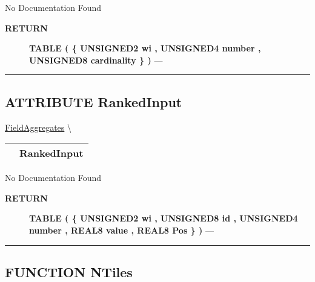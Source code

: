 \par





No Documentation Found








\par
\begin{description}
\item [\colorbox{tagtype}{\color{white} \textbf{\textsf{RETURN}}}] \textbf{TABLE ( \{ UNSIGNED2 wi , UNSIGNED4 number , UNSIGNED8 cardinality \} )} --- 
\end{description}




\rule{\linewidth}{0.5pt}
\subsection*{\textsf{\colorbox{headtoc}{\color{white} ATTRIBUTE}
RankedInput}}

\hypertarget{ecldoc:ml_core.fieldaggregates.rankedinput}{}
\hspace{0pt} \hyperlink{ecldoc:ml_core.fieldaggregates}{FieldAggregates} \textbackslash 

{\renewcommand{\arraystretch}{1.5}
\begin{tabularx}{\textwidth}{|>{\raggedright\arraybackslash}l|X|}
\hline
\hspace{0pt}\mytexttt{\color{red} } & \textbf{RankedInput} \\
\hline
\end{tabularx}
}

\par





No Documentation Found








\par
\begin{description}
\item [\colorbox{tagtype}{\color{white} \textbf{\textsf{RETURN}}}] \textbf{TABLE ( \{ UNSIGNED2 wi , UNSIGNED8 id , UNSIGNED4 number , REAL8 value , REAL8 Pos \} )} --- 
\end{description}




\rule{\linewidth}{0.5pt}
\subsection*{\textsf{\colorbox{headtoc}{\color{white} FUNCTION}
NTiles}}


